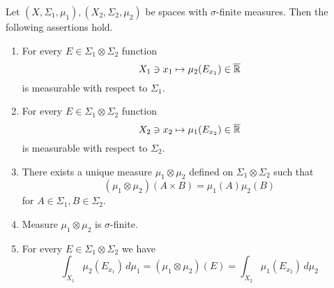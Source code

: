 \begin{theorem}\label{theorem:fubinitheorembasic}
Let $(X,\Sigma_1,\mu_1), (X_2,\Sigma_2,\mu_2)$ be spaces with $\sigma$-finite measures. Then the following assertions hold.
\begin{enumerate}[label=\emph{\textbf{(\arabic*)}}, leftmargin=*]
\item For every $E\in \Sigma_1\otimes \Sigma_2$ function
$$X_1\ni x_1\mapsto \mu_2(E_{x_1})\in \overline{{\mathbb R}}$$
is measurable with respect to $\Sigma_1$.
\item For every $E\in \Sigma_1\otimes \Sigma_2$ function
$$X_2\ni x_2\mapsto \mu_1(E_{x_2})\in \overline{{\mathbb R}}$$
is measurable with respect to $\Sigma_2$.
\item There exists a unique measure $\mu_1\otimes \mu_2$ defined on $\Sigma_1\otimes \Sigma_2$ such that
$$\left(\mu_1\otimes \mu_2\right)\left(A\times B\right) = \mu_1(A)\mu_2(B)$$
for $A\in \Sigma_1, B\in \Sigma_2$.
\item Measure $\mu_1\otimes \mu_2$ is $\sigma$-finite.
\item For every $E\in \Sigma_1\otimes \Sigma_2$ we have
$$\int_{X_1}\mu_2(E_{x_1})\,d\mu_1 = \left(\mu_1\otimes \mu_2\right)(E) = \int_{X_2}\mu_1(E_{x_2})\,d\mu_2$$
\end{enumerate}
\end{theorem}
